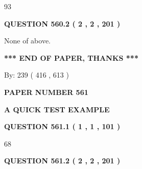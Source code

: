 \documentclass[12pt]{article}
\begin{document}
93
 
 
  
\vspace{0.2in}
  
{\textbf{\Large{QUESTION
560.2 
 ( 2 , 2 , 201 )
}}}
  
  
 
 
\noindent{}
 
 
 None of above.
 
 
 
 
   
   
 \vspace{0.2in}
 
   
   
   
   
\vspace{1.0in} 
{\textbf{\large{ *** END OF PAPER, THANKS *** }}} 
   
   
\hspace{1.0in} By: 
 239 ( 416 ,  613 )
   
   
   
   
\newpage 
\setcounter{page}{ 
   561001 } 
   
   
   
   
 {\textbf{ \Large{ PAPER NUMBER  561  }}}
   
   
\vspace{0.2in}
   
   
   
   
   
   
 \vspace{0.2in}
{\LARGE {\textbf{ A QUICK TEST EXAMPLE}}}
   
   
  
\vspace{0.2in}
  
{\textbf{\Large{QUESTION
561.1 
 ( 1 , 1 , 101 )
}}}
  
  
 
 
\noindent{}

68
 
 
  
\vspace{0.2in}
  
{\textbf{\Large{QUESTION
561.2 
 ( 2 , 2 , 201 )
}}}
  
  
 
\end{document}
